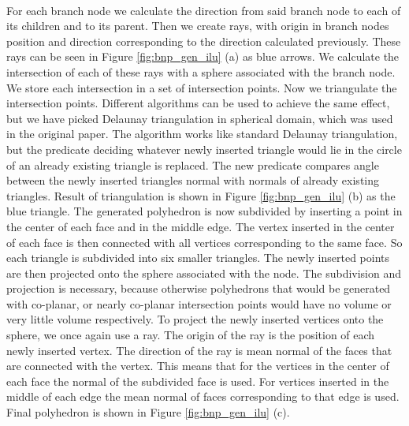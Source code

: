 \paragraph{}
For each branch node we calculate the direction from said branch node to each of its children and to its parent. Then we create rays, with origin in branch nodes position and direction corresponding to the direction calculated previously. These rays can be seen in Figure \ref{fig:bnp_gen_ilu} (a) as blue arrows. We calculate the intersection of each of these rays with a sphere associated with the branch node. We store each intersection in a set of intersection points. Now we triangulate the intersection points. Different algorithms can be used to achieve the same effect, but we have picked Delaunay triangulation in spherical domain, which was used in the original paper. The algorithm works like standard Delaunay triangulation, but the predicate deciding whatever newly inserted triangle would lie in the circle of an already existing triangle is replaced. The new predicate compares angle between the newly inserted triangles normal with normals of already existing triangles. Result of triangulation is shown in Figure \ref{fig:bnp_gen_ilu} (b) as the blue triangle. The generated polyhedron is now subdivided by inserting a point in the center of each face and in the middle edge. The vertex inserted in the center of each face is then connected with all vertices corresponding to the same face. So each triangle is subdivided into six smaller triangles. The newly inserted points are then projected onto the sphere associated with the node. The subdivision and projection is necessary, because otherwise polyhedrons that would be generated with co-planar, or nearly co-planar intersection points would have no volume or very little volume respectively. To project the newly inserted vertices onto the sphere, we once again use a ray. The origin of the ray is the position of each newly inserted vertex. The direction of the ray is mean normal of the faces that are connected with the vertex. This means that for the vertices in the center of each face the normal of the subdivided face is used. For vertices inserted in the middle of each edge the mean normal of faces corresponding to that edge is used. Final polyhedron is shown in Figure \ref{fig:bnp_gen_ilu} (c).

